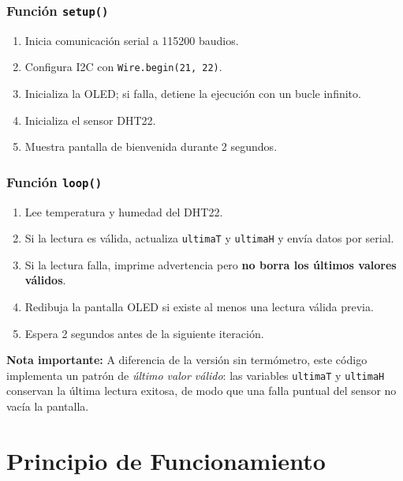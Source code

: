 \documentclass[12pt,a4paper]{article}
\begin{document}
\subsubsection*{Función \texttt{setup()}}
\begin{enumerate}
    \item Inicia comunicación serial a 115200 baudios.
    \item Configura I2C con \texttt{Wire.begin(21, 22)}.
    \item Inicializa la OLED; si falla, detiene la ejecución con un bucle infinito.
    \item Inicializa el sensor DHT22.
    \item Muestra pantalla de bienvenida durante 2 segundos.
\end{enumerate}

\subsubsection*{Función \texttt{loop()}}
\begin{enumerate}
    \item Lee temperatura y humedad del DHT22.
    \item Si la lectura es válida, actualiza \texttt{ultimaT} y \texttt{ultimaH} y envía datos por serial.
    \item Si la lectura falla, imprime advertencia pero \textbf{no borra los últimos valores válidos}.
    \item Redibuja la pantalla OLED si existe al menos una lectura válida previa.
    \item Espera 2 segundos antes de la siguiente iteración.
\end{enumerate}

\textbf{Nota importante:} A diferencia de la versión sin termómetro, este código implementa un patrón de \textit{último valor válido}: las variables \texttt{ultimaT} y \texttt{ultimaH} conservan la última lectura exitosa, de modo que una falla puntual del sensor no vacía la pantalla.

\section{Principio de Funcionamiento}
\end{document}
